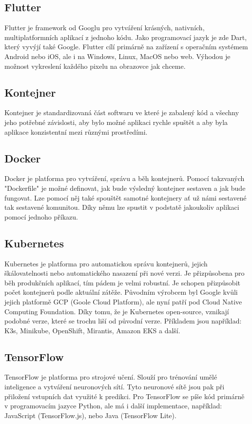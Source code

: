 \subsection{Flutter}
Flutter je framework od Googlu pro vytváření krásných, nativních, multiplatformních aplikací z jednoho kódu. \cite{Flutter} Jako programovací jazyk je zde Dart, který vyvýjí také Google. Flutter cílí primárně na zařízení s operačním systémem Android nebo iOS, ale i na Windows, Linux, MacOS nebo web. Výhodou je možnost vykreslení každého pixelu na obrazovce jak chceme.

\subsection{Kontejner}
Kontejner je standardizovaná část softwaru ve které je zabalený kód a všechny jeho potřebné závislosti, aby bylo možné aplikaci rychle spuštět a aby byla aplikace konzistentní mezi různými prostředími. \cite{Kontejner}

\subsection{Docker}
Docker je platforma pro vytváření, správu a běh kontejnerů. Pomocí takzvaných "Dockerfile" je možné definovat, jak bude výsledný kontejner sestaven a jak bude fungovat. Lze pomocí něj také spouštět samotné kontejnery ať už námi sestavené tak sestavené komunitou. Díky němu lze spustit v podstatě jakoukoliv aplikaci pomocí jednoho příkazu.

\subsection{Kubernetes}
Kubernetes je platforma pro automatickou správu kontejnerů, jejich škálovatelnosti nebo automatického nasazení při nové verzi. Je přizpůsobena pro běh produkčních aplikací, tím pádem je velmi robustní. Je schopen přizpůsobit počet kontejnerů podle aktuální zátěže. Původním výrobcem byl Google kvůli jejich platformě GCP (Goole Cloud Platform), ale nyní patří pod Cloud Native Computing Foundation. Díky tomu, že je Kubernetes open-source, vznikají podobné verze, které se trochu liší od původní verze. Příkladem jsou například: K3s, Minikube, OpenShift, Mirantis, Amazon EKS a další.

\subsection{TensorFlow}
TensorFlow je platforma pro strojové učení. Slouží pro trénování umělé inteligence a vytváření neuronových sítí. Tyto neuronové sítě jsou pak při přiložení vstupních dat využité k predikci. Pro TensorFlow se píše kód primárně v programovacím jazyce Python, ale má i další implementace, například: JavaScript (TensorFlow.js), nebo Java (TensorFlow Lite).

